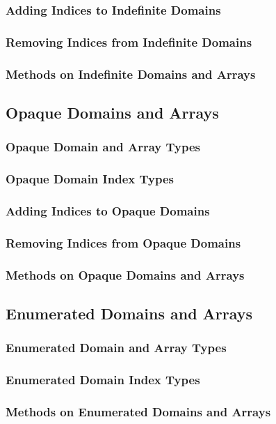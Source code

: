 \documentclass[10pt,twoside,titlepage]{article}
\begin{document}
\subsubsection{Adding Indices to Indefinite Domains}
\subsubsection{Removing Indices from Indefinite Domains}
\subsubsection{Methods on Indefinite Domains and Arrays}
\subsection{Opaque Domains and Arrays}
\subsubsection{Opaque Domain and Array Types}
\subsubsection{Opaque Domain Index Types}
\subsubsection{Adding Indices to Opaque Domains}
\subsubsection{Removing Indices from Opaque Domains}
\subsubsection{Methods on Opaque Domains and Arrays}
\subsection{Enumerated Domains and Arrays}
\subsubsection{Enumerated Domain and Array Types}
\subsubsection{Enumerated Domain Index Types}
\subsubsection{Methods on Enumerated Domains and Arrays}
\end{document}
